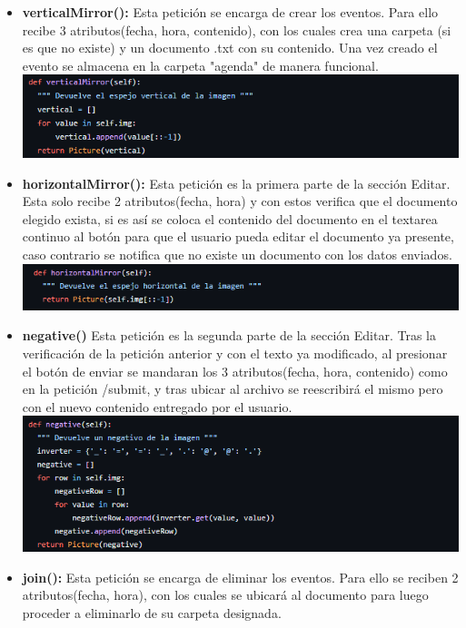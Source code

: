 \documentclass{article}
\begin{document}
\begin{itemize}
    \item \textbf{verticalMirror(): } Esta petición se encarga de crear los eventos. Para ello recibe 3 atributos(fecha, hora, contenido), con los cuales crea una carpeta (si es que no existe) y un documento .txt con su contenido. Una vez creado el evento se almacena en la carpeta "agenda" de manera funcional.\\



\includegraphics[width=\textwidth]{img/1.png}
\item \textbf{horizontalMirror(): } Esta petición es la primera parte de la sección Editar. Esta solo recibe 2 atributos(fecha, hora) y con estos verifica que el documento elegido exista, si es así se coloca el contenido del documento en el textarea continuo al botón para que el usuario pueda editar el documento ya presente, caso contrario se notifica que no existe un documento con los datos enviados.\\



\includegraphics[width=\textwidth]{img/2.png}
\item \textbf{negative() } Esta petición es la segunda parte de la sección Editar. Tras la verificación de la petición anterior y con el texto ya modificado, al presionar el botón de enviar se mandaran los 3 atributos(fecha, hora, contenido) como en la petición /submit, y tras ubicar al archivo se reescribirá el mismo pero con el nuevo contenido entregado por el usuario.\\



\includegraphics[width=\textwidth]{img/3.png}
\item \textbf{join(): } Esta petición se encarga de eliminar los eventos. Para ello se reciben 2 atributos(fecha, hora), con los cuales se ubicará al documento para luego proceder a eliminarlo de su carpeta designada. \\




\end{itemize}
\end{document}
